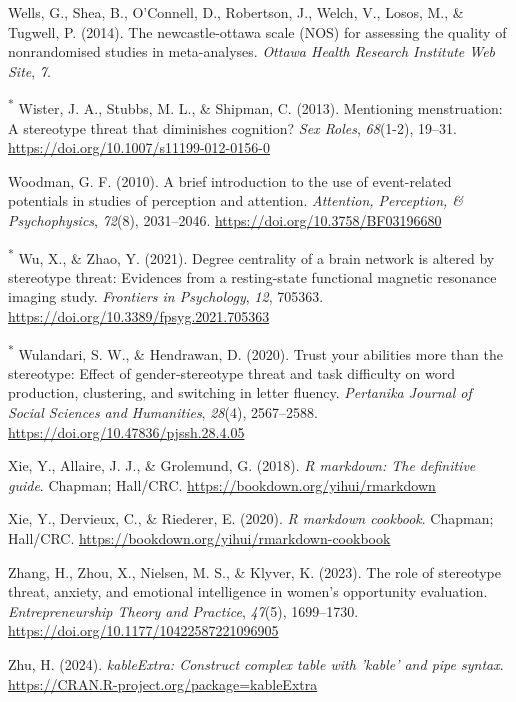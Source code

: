 \documentclass[
  stu, a4paper,floatsintext]{apa7}
\newlength{\cslhangindent}
\newenvironment{CSLReferences}[2] %
 {\begin{list}{}{%
  \setlength{\itemindent}{0pt}
  \setlength{\leftmargin}{0pt}
  \setlength{\parsep}{0pt}
  \ifodd #1
   \setlength{\leftmargin}{\cslhangindent}
   \setlength{\itemindent}{-1\cslhangindent}
  \fi
  \setlength{\itemsep}{#2\baselineskip}}}
 {\end{list}}
\begin{document}
\begin{CSLReferences}{1}{0}
Wells, G., Shea, B., O'Connell, D., Robertson, J., Welch, V., Losos, M., \& Tugwell, P. (2014). The newcastle-ottawa scale ({NOS}) for assessing the quality of nonrandomised studies in meta-analyses. \emph{Ottawa Health Research Institute Web Site}, \emph{7}.

\textsuperscript{*} Wister, J. A., Stubbs, M. L., \& Shipman, C. (2013). Mentioning menstruation: A stereotype threat that diminishes cognition? \emph{Sex Roles}, \emph{68}(1-2), 19--31. \url{https://doi.org/10.1007/s11199-012-0156-0}

Woodman, G. F. (2010). A brief introduction to the use of event-related potentials in studies of perception and attention. \emph{Attention, Perception, \& Psychophysics}, \emph{72}(8), 2031--2046. \url{https://doi.org/10.3758/BF03196680}

\textsuperscript{*} Wu, X., \& Zhao, Y. (2021). Degree centrality of a brain network is altered by stereotype threat: {Evidences} from a resting-state functional magnetic resonance imaging study. \emph{Frontiers in Psychology}, \emph{12}, 705363. \url{https://doi.org/10.3389/fpsyg.2021.705363}

\textsuperscript{*} Wulandari, S. W., \& Hendrawan, D. (2020). Trust your abilities more than the stereotype: {Effect} of gender-stereotype threat and task difficulty on word production, clustering, and switching in letter fluency. \emph{Pertanika Journal of Social Sciences and Humanities}, \emph{28}(4), 2567--2588. \url{https://doi.org/10.47836/pjssh.28.4.05}

Xie, Y., Allaire, J. J., \& Grolemund, G. (2018). \emph{R markdown: The definitive guide}. Chapman; Hall/CRC. \url{https://bookdown.org/yihui/rmarkdown}

Xie, Y., Dervieux, C., \& Riederer, E. (2020). \emph{R markdown cookbook}. Chapman; Hall/CRC. \url{https://bookdown.org/yihui/rmarkdown-cookbook}

Zhang, H., Zhou, X., Nielsen, M. S., \& Klyver, K. (2023). The role of stereotype threat, anxiety, and emotional intelligence in women's opportunity evaluation. \emph{Entrepreneurship Theory and Practice}, \emph{47}(5), 1699--1730. \url{https://doi.org/10.1177/10422587221096905}

Zhu, H. (2024). \emph{kableExtra: Construct complex table with 'kable' and pipe syntax}. \url{https://CRAN.R-project.org/package=kableExtra}

\end{CSLReferences}


\clearpage
\renewcommand{\listfigurename}{Figure captions}

\clearpage
\renewcommand{\listtablename}{Table captions}
\end{document}
